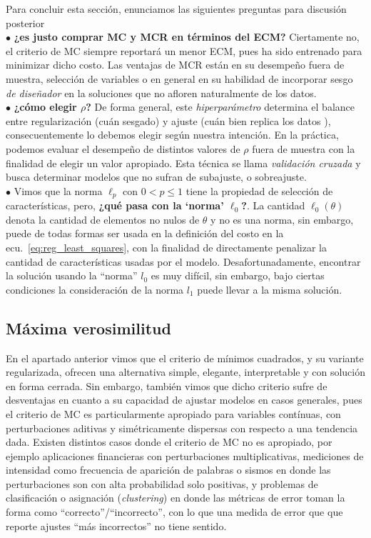 \begin{mdframed}[style=discusion, frametitle={\center Regularización: Consideraciones generales}]
Para concluir esta sección, enunciamos las siguientes preguntas para discusión posterior\\
$\bullet$ \textbf{¿es justo comprar MC y MCR en términos del ECM?} Ciertamente no, el criterio de MC siempre reportará un menor ECM, pues ha sido entrenado para minimizar dicho costo. Las ventajas de MCR están en su desempeño fuera de muestra, selección de variables o en  general en su habilidad de  incorporar  sesgo  \emph{de diseñador} en la soluciones que no afloren naturalmente de  los  datos. \\
$\bullet$ \textbf{¿cómo elegir $\rho$?} De forma general, este \emph{hiperparámetro} determina el balance entre regularización (cuán  sesgado) y ajuste (cuán bien replica  los datos ), consecuentemente lo debemos elegir según nuestra intención. En la práctica,  podemos evaluar el desempeño de distintos valores de $\rho$ fuera de muestra con la finalidad de elegir un valor apropiado. Esta técnica se llama \emph{validación cruzada} y busca determinar modelos que no sufran de subajuste, o sobreajuste.\\
$\bullet$ Vimos que la norma $\ell_p$ con $0<p\leq1$ tiene la propiedad de selección de características, pero, \textbf{¿qué pasa con la `norma' $\ell_0$?}. La cantidad  $\ell_0(\theta)$ denota la cantidad de elementos no nulos de $\theta$ y no es una norma, sin embargo, puede de todas formas ser usada en la definición del costo en la ecu.~\eqref{eq:reg_least_squares}, con la finalidad de directamente penalizar la cantidad de características usadas por el modelo. Desafortunadamente, encontrar la solución usando la ``norma'' $l_0$ es muy difícil, sin embargo, bajo ciertas condiciones la consideración de la norma $l_1$ puede llevar a la misma solución.
\end{mdframed}

\subsection{Máxima verosimilitud} %
\label{ssub:max_ver}


En el apartado anterior vimos que el criterio de  mínimos cuadrados, y su variante regularizada, ofrecen una alternativa simple, elegante, interpretable y con solución en forma cerrada. Sin embargo, también vimos que dicho criterio sufre de desventajas en cuanto a su capacidad de ajustar modelos en casos generales, pues el criterio de MC es particularmente apropiado para variables contínuas, con perturbaciones aditivas  y simétricamente dispersas con respecto a una tendencia dada. Existen distintos casos donde el criterio de MC no es apropiado, por ejemplo aplicaciones financieras con  perturbaciones multiplicativas, mediciones de intensidad como frecuencia de aparición de palabras o sismos en donde las perturbaciones son con alta probabilidad solo positivas, y problemas de clasificación o asignación (\emph{clustering}) en donde las métricas de error toman la forma como ``correcto''/``incorrecto'', con lo que una medida de error que que reporte ajustes ``más incorrectos'' no tiene sentido. 

